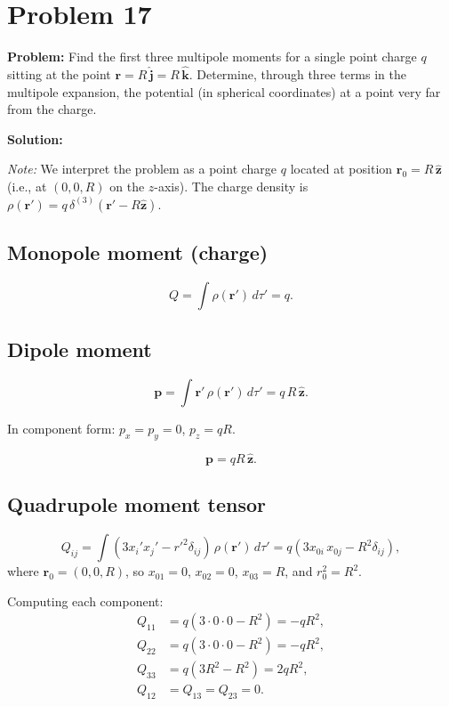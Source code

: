 \documentclass[12pt]{article}
\newcommand{\vect}[1]{\mathbf{#1}}
\begin{document}
\section*{Problem 17}

\textbf{Problem:} Find the first three multipole moments for a single point charge $q$ sitting at the point $\vect{r} = R\,\hat{\vect{j}} = R\,\hat{\vect{k}}$. Determine, through three terms in the multipole expansion, the potential (in spherical coordinates) at a point very far from the charge.

\bigskip
\textbf{Solution:}

\textit{Note:} We interpret the problem as a point charge $q$ located at position $\vect{r}_0 = R\,\hat{\vect{z}}$ (i.e., at $(0, 0, R)$ on the $z$-axis). The charge density is $\rho(\vect{r}') = q\,\delta^{(3)}(\vect{r}' - R\hat{\vect{z}})$.

\subsection*{Monopole moment (charge)}

\[
Q = \int \rho(\vect{r}')\,d\tau' = \boxed{q}.
\]

\subsection*{Dipole moment}

\[
\vect{p} = \int \vect{r}'\,\rho(\vect{r}')\,d\tau' = q\,R\,\hat{\vect{z}}.
\]

In component form: $p_x = p_y = 0$, $p_z = qR$.

\[
\boxed{\vect{p} = qR\,\hat{\vect{z}}}.
\]

\subsection*{Quadrupole moment tensor}

\[
Q_{ij} = \int (3x_i'x_j' - r'^2\delta_{ij})\,\rho(\vect{r}')\,d\tau' = q(3 x_{0i}\,x_{0j} - R^2\delta_{ij}),
\]
where $\vect{r}_0 = (0, 0, R)$, so $x_{01} = 0$, $x_{02} = 0$, $x_{03} = R$, and $r_0^2 = R^2$.

Computing each component:
\begin{align}
Q_{11} &= q(3\cdot 0\cdot 0 - R^2) = -qR^2, \\
Q_{22} &= q(3\cdot 0\cdot 0 - R^2) = -qR^2, \\
Q_{33} &= q(3R^2 - R^2) = 2qR^2, \\
Q_{12} &= Q_{13} = Q_{23} = 0.
\end{align}
\end{document}
